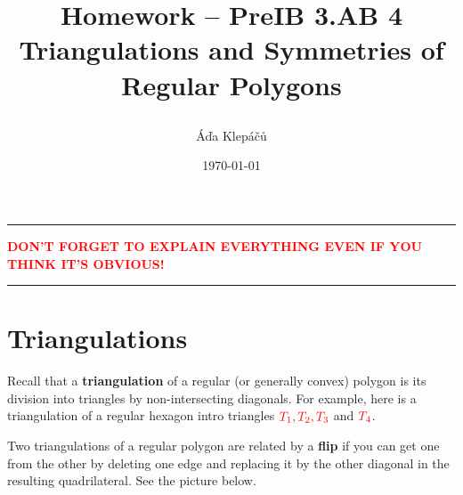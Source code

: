 \documentclass[a4paper,11pt]{article}
\title{\Huge\textsf{Homework -- PreIB 3.AB 4}\\
 \Large\textsf{Triangulations and Symmetries of Regular Polygons}
 \author{Áďa Klepáčů}
 \date{\today}
}
\newcommand{\clr}{\textcolor{red}}
\begin{document}
\maketitle
\thispagestyle{fancy}

\begin{center}
 \hrule
 \textbf{\clr{DON'T FORGET TO EXPLAIN EVERYTHING EVEN IF YOU THINK IT'S
 OBVIOUS!}}
 \vspace{2ex}
 \hrule
\end{center}
 
\section*{Triangulations}

Recall that a \textbf{triangulation} of a regular (or generally convex) polygon
is its division into triangles by non-intersecting diagonals. For example, here
is a triangulation of a regular hexagon intro triangles $\clr{T_1,T_2,T_3}$ and
$\clr{T_4}$.

\begin{figure}[ht]
 \centering
\end{figure}

Two triangulations of a regular polygon are related by a \textbf{flip} if you
can get one from the other by deleting one edge and replacing it by the other
diagonal in the resulting quadrilateral. See the picture below.
\end{document}
